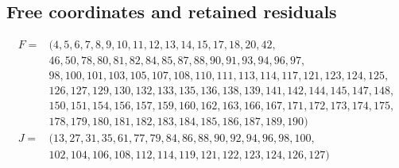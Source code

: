 \subsection*{Free coordinates and retained residuals}
\begin{align*}
F={}&(4,5,6,7,8,9,10,11,12,13,14,15,17,18,20,42,\\
&{}46,50,78,80,81,82,84,85,87,88,90,91,93,94,96,97,\\
&{}98,100,101,103,105,107,108,110,111,113,114,117,121,123,124,125,\\
&{}126,127,129,130,132,133,135,136,138,139,141,142,144,145,147,148,\\
&{}150,151,154,156,157,159,160,162,163,166,167,171,172,173,174,175,\\
&{}178,179,180,181,182,183,184,185,186,187,189,190)\\
J={}&(13,27,31,35,61,77,79,84,86,88,90,92,94,96,98,100,\\
&{}102,104,106,108,112,114,119,121,122,123,124,126,127)\\
\end{align*}
